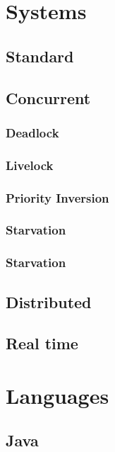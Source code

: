 \documentclass[a4paper,oneside]{report}
\begin{document}
\section{Systems}


	\subsection{Standard}



	\subsection{Concurrent}

		\subsubsection{Deadlock}
			
		\subsubsection{Livelock}

		\subsubsection{Priority Inversion}

		\subsubsection{Starvation}

		\subsubsection{Starvation}


	\subsection{Distributed}

	\subsection{Real time}


\section{Languages}

	\subsection{Java}
	
\end{document}
